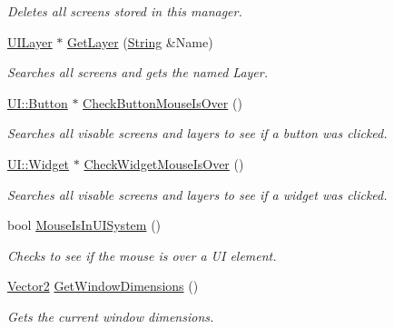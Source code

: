 \begin{DoxyCompactItemize}
\begin{DoxyCompactList}\small\item\em Deletes all screens stored in this manager. \item\end{DoxyCompactList}\item 
\hyperlink{classphys_1_1UILayer}{UILayer} $\ast$ \hyperlink{classphys_1_1UIManager_ad80ed1716853f6e09cadc5f896e875e8}{GetLayer} (\hyperlink{namespacephys_aa03900411993de7fbfec4789bc1d392e}{String} \&Name)
\begin{DoxyCompactList}\small\item\em Searches all screens and gets the named Layer. \item\end{DoxyCompactList}\item 
\hyperlink{classphys_1_1UI_1_1Button}{UI::Button} $\ast$ \hyperlink{classphys_1_1UIManager_aa1022fcbe8e1efc7a383b2eff834a152}{CheckButtonMouseIsOver} ()
\begin{DoxyCompactList}\small\item\em Searches all visable screens and layers to see if a button was clicked. \item\end{DoxyCompactList}\item 
\hyperlink{classphys_1_1UI_1_1Widget}{UI::Widget} $\ast$ \hyperlink{classphys_1_1UIManager_ab9840b483409d3453a67931b4d858d1b}{CheckWidgetMouseIsOver} ()
\begin{DoxyCompactList}\small\item\em Searches all visable screens and layers to see if a widget was clicked. \item\end{DoxyCompactList}\item 
bool \hyperlink{classphys_1_1UIManager_a38bc8d2ed1930a8ff6e82ef5f991dbe1}{MouseIsInUISystem} ()
\begin{DoxyCompactList}\small\item\em Checks to see if the mouse is over a UI element. \item\end{DoxyCompactList}\item 
\hyperlink{classphys_1_1Vector2}{Vector2} \hyperlink{classphys_1_1UIManager_ae56846a64d8ce312aa36a749d15619df}{GetWindowDimensions} ()
\begin{DoxyCompactList}\small\item\em Gets the current window dimensions. \item\end{DoxyCompactList}\item 

\end{DoxyCompactItemize}
